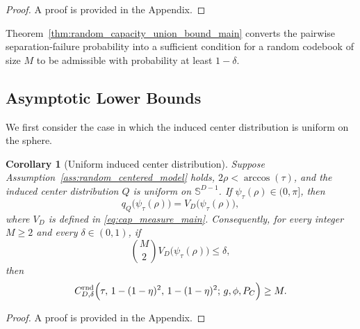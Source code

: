 \documentclass[journal]{IEEEtran}
\newtheorem{corollary}[theorem]{Corollary}
\begin{document}
\begin{bibunit}
\begin{proof}
A proof is provided in the Appendix.
\end{proof}

Theorem~\ref{thm:random_capacity_union_bound_main} converts the pairwise separation-failure probability into a sufficient condition for a random codebook of size $M$ to be admissible with probability at least $1-\delta$.




\subsection{Asymptotic Lower Bounds}

We first consider the case in which the induced center distribution is uniform on the sphere.

\begin{corollary}[Uniform induced center distribution]
\label{cor:uniform_center_distribution_main}
%
Suppose Assumption~\ref{ass:random_centered_model} holds, $2\rho<\arccos(\tau)$, and the induced center distribution $Q$ is uniform on $\mathbb S^{D-1}$. If $\psi_\tau(\rho)\in(0,\pi]$, then
%
\begin{equation}
q_Q\bigl(\psi_\tau(\rho)\bigr) = V_D\bigl(\psi_\tau(\rho)\bigr),
\label{eq:uniform_collision_probability_main}
\end{equation}
%
where $V_D$ is defined in \eqref{eq:cap_measure_main}. Consequently, for every integer $M\ge2$ and every $\delta\in(0,1)$, if
%
\begin{equation}
\binom{M}{2} V_D\bigl(\psi_\tau(\rho)\bigr) \le\delta,
\label{eq:uniform_capacity_condition_main}
\end{equation}
%
then
%
\begin{equation}
C_{D,\delta}^{\mathrm{rnd}} \Bigl( \tau,\, 1-(1-\eta)^2,\,
1-(1-\eta)^2;\, g,\phi,P_C \Bigr) \ge M.
\label{eq:uniform_random_capacity_lower_bound_main}
\end{equation}
%
\end{corollary}

\begin{proof}
A proof is provided in the Appendix.
\end{proof}


\end{bibunit}
\end{document}
